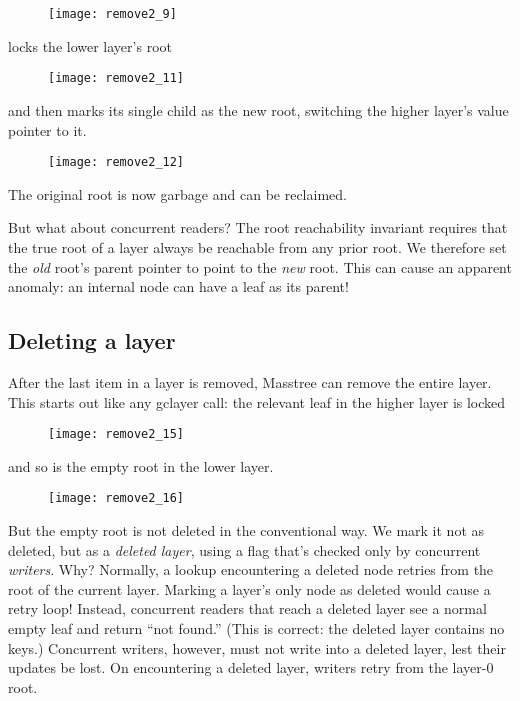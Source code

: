 \documentclass[11pt]{article}
\begin{document}
\begin{figure}[H]
\texttt{[image: remove2\_9]}
\end{figure}

\noindent%
locks the lower layer's root

\begin{figure}[H]
\texttt{[image: remove2\_11]}
\end{figure}

\noindent%
and then marks its single child as the new root, switching the higher
layer's value pointer to it.

\begin{figure}[H]
\texttt{[image: remove2\_12]}
\end{figure}

The original root is now garbage and can be reclaimed.

But what about concurrent readers? The root reachability invariant
requires that the true root of a layer always be reachable from any
prior root. We therefore set the \emph{old} root's parent pointer to
point to the \emph{new} root. This can cause an apparent anomaly: an
internal node can have a leaf as its parent!

\subsection{Deleting a layer}

After the last item in a layer is removed, Masstree can remove the
entire layer. This starts out like any gclayer call: the relevant leaf
in the higher layer is locked

\begin{figure}[H]
\texttt{[image: remove2\_15]}
\end{figure}

\noindent
and so is the empty root in the lower layer.

\begin{figure}[H]
\texttt{[image: remove2\_16]}
\end{figure}

\noindent%
But the empty root is not deleted in the conventional way. We mark it
not as deleted, but as a \emph{deleted layer}, using
a flag that's checked only by concurrent \emph{writers}. Why?
Normally, a lookup encountering a deleted node retries from the root of
the current layer. Marking a layer's only node as deleted would cause a
retry loop! Instead, concurrent readers that reach a deleted layer see a
normal empty leaf and return ``not found.'' (This is correct: the
deleted layer contains no keys.) Concurrent writers, however, must not
write into a deleted layer, lest their updates be lost. On encountering
a deleted layer, writers retry from the layer-0 root.
\end{document}
